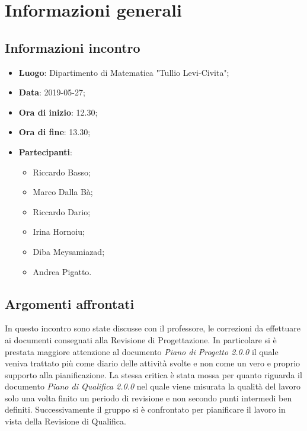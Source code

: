 \section{Informazioni generali}

\subsection{Informazioni incontro}
\begin{itemize}
	\item \textbf{Luogo}: Dipartimento di Matematica "Tullio Levi-Civita";
	\item \textbf{Data}: 2019-05-27;
	\item \textbf{Ora di inizio}: 12.30;
	\item \textbf{Ora di fine}: 13.30;
	\item \textbf{Partecipanti}: 
	\begin{itemize}
		\item Riccardo Basso;
		\item Marco Dalla Bà;
		\item Riccardo Dario;
		\item Irina Hornoiu;
		\item Diba Meysamiazad;
		\item Andrea Pigatto.	
	\end{itemize}
\end{itemize}

\subsection{Argomenti affrontati}
In questo incontro sono state discusse con il professore, le correzioni da effettuare ai documenti consegnati alla Revisione di Progettazione.
In particolare si è prestata maggiore attenzione al documento \textit{Piano di Progetto 2.0.0} il quale veniva trattato più come diario delle attività svolte e non come un vero e proprio supporto alla pianificazione. La stessa critica è stata mossa per quanto riguarda il documento \textit{Piano di Qualifica 2.0.0} nel quale viene misurata la qualità del lavoro solo una volta finito un periodo di revisione e non secondo punti intermedi ben definiti.
Successivamente il gruppo si è confrontato per pianificare il lavoro in vista della Revisione di Qualifica.
